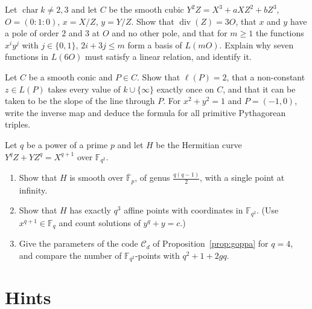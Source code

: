 \begin{exercise}[$\star\star$]\label{ex:weierstrass}
Let $\operatorname{char}k\ne2,3$ and let $C$ be the smooth cubic $Y^2Z=X^3+aXZ^2+bZ^3$, $O=(0:1:0)$, $x=X/Z$, $y=Y/Z$. Show that $\operatorname{div}(Z)=3O$, that
$x$ and $y$ have a pole of order $2$ and $3$ at $O$ and no other pole, and that for $m\ge1$ the functions $x^iy^j$ with $j\in\{0,1\}$, $2i+3j\le m$ form a
basis of $L(mO)$. Explain why seven functions in $L(6O)$ must satisfy a linear relation, and identify it.
\end{exercise}

\begin{exercise}[$\star\star$]\label{ex:conic}
Let $C$ be a smooth conic and $P\in C$. Show that $\ell(P)=2$, that a non-constant $z\in L(P)$ takes every value of $k\cup\{\infty\}$ exactly once on $C$, and that
it can be taken to be the slope of the line through $P$. For $x^2+y^2=1$ and $P=(-1,0)$, write the inverse map and deduce the formula for all primitive
Pythagorean triples.
\end{exercise}

\begin{exercise}[$\star\star\star$]\label{ex:hermitian}
Let $q$ be a power of a prime $p$ and let $H$ be the Hermitian curve $Y^qZ+YZ^q=X^{q+1}$ over $\mathbb F_{q^2}$.
\begin{enumerate}[label=(\alph*)]
\item Show that $H$ is smooth over $\overline{\mathbb F}_p$, of genus $\frac{q(q-1)}2$, with a single point at infinity.
\item Show that $H$ has exactly $q^3$ affine points with coordinates in $\mathbb F_{q^2}$. (Use $x^{q+1}\in\mathbb F_q$ and count solutions of $y^q+y=c$.)
\item Give the parameters of the code $\mathcal C_d$ of Proposition~\ref{prop:goppa} for $q=4$, and compare the number of $\mathbb F_{q^2}$-points with
$q^2+1+2gq$.
\end{enumerate}
\end{exercise}

\section{Hints}

